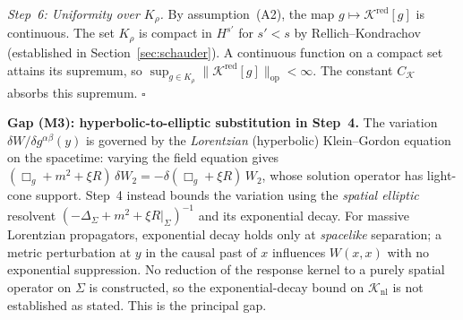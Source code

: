 \documentclass[12pt,a4paper]{article}
\begin{document}
\smallskip\noindent\textit{Step~6: Uniformity over $K_\rho$.}
By assumption~(A2), the map $g \mapsto \mathcal{K}^{\mathrm{red}}[g]$ is continuous.
The set $K_\rho$ is compact in $H^{s'}$ for $s' < s$ by Rellich--Kondrachov
(established in Section~\ref{sec:schauder}). A continuous function on a compact set
attains its supremum, so
$\sup_{g \in K_\rho}\|\mathcal{K}^{\mathrm{red}}[g]\|_{\mathrm{op}} < \infty$.
The constant $C_{\mathcal{K}}$ absorbs this supremum. \hfill$\square$

\smallskip\noindent\textbf{Gap (M3): hyperbolic-to-elliptic substitution in Step~4.}
The variation $\delta W/\delta g^{\alpha\beta}(y)$ is governed by the \emph{Lorentzian}
(hyperbolic) Klein--Gordon equation on the spacetime: varying the field equation gives
$(\Box_g + m^2 + \xi R)\,\delta W_2 = -\delta(\Box_g + \xi R)\,W_2$, whose solution
operator has light-cone support. Step~4 instead bounds the variation using the
\emph{spatial elliptic} resolvent $(-\Delta_\Sigma + m^2 + \xi R|_\Sigma)^{-1}$ and its
exponential decay. For massive Lorentzian propagators, exponential decay holds only at
\emph{spacelike} separation; a metric perturbation at $y$ in the causal past of $x$
influences $W(x,x)$ with no exponential suppression. No reduction of the response kernel
to a purely spatial operator on $\Sigma$ is constructed, so the exponential-decay bound
on $\mathcal{K}_{\mathrm{nl}}$ is not established as stated. This is the principal gap.
\end{document}
